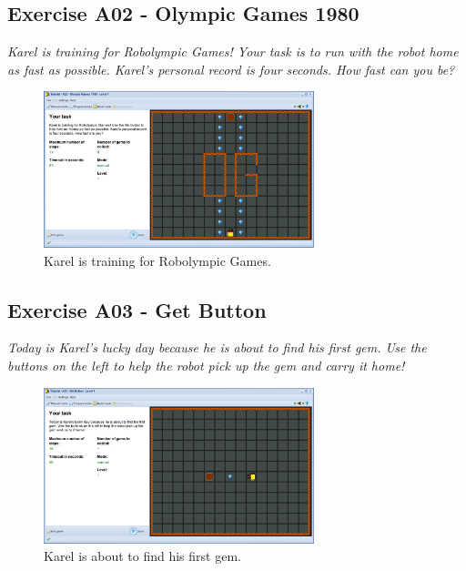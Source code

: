 \documentclass[article,A4,12pt]{llncs}
\begin{document}
\subsection{Exercise A02 - Olympic Games 1980}

{\em Karel is training for Robolympic Games! Your task is to run with 
the robot home as fast as possible. Karel's personal record is four seconds. How fast can you be?}

\begin{figure}[!ht]
\begin{center}
\includegraphics[width=0.7\textwidth]{img/a02.png}
\end{center}
\vspace{-4mm}
\caption{Karel is training for Robolympic Games.}
\label{fig:a02}
\vspace{-4mm}
\end{figure}
\noindent

\subsection{Exercise A03 - Get Button}

{\em Today is Karel's lucky day because he is about to find his first gem. 
Use the buttons on the left to help the robot pick up the gem and carry it 
home!}

\begin{figure}[!ht]
\begin{center}
\includegraphics[width=0.7\textwidth]{img/a03.png}
\end{center}
\vspace{-4mm}
\caption{Karel is about to find his first gem.}
\label{fig:a03}
\vspace{-1cm}
\end{figure}
\noindent
\end{document}
